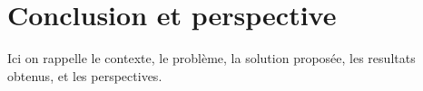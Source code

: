 
\chapter{Conclusion et perspective} %
\label{chapter_conclusion} %

Ici on rappelle le contexte, le problème, la solution proposée, les resultats obtenus, et les perspectives.
